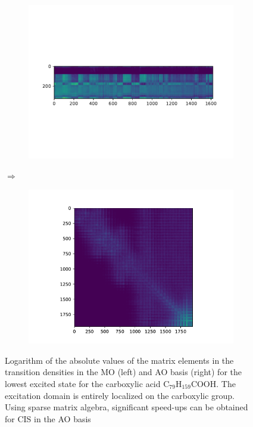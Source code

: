 \begin{figure}
\centering
\begin{subfigure}{0.3\linewidth}
\centering
\includegraphics[scale=0.6]{Pics/CISDENSE}
\caption{}
\end{subfigure}
$\Longrightarrow$
\begin{subfigure}{0.6\linewidth}
\centering
\includegraphics[scale=0.6]{Pics/CIS}
\caption{}
\end{subfigure}
\caption{Logarithm of the absolute values of the matrix elements in the transition densities in the MO (left) and AO basis (right) for the lowest excited state for the carboxylic acid C$_{79}$H$_{159}$COOH. The excitation domain is entirely localized on the carboxylic group. Using sparse matrix algebra, significant speed-ups can be obtained for CIS in the AO basis}
\end{figure}

